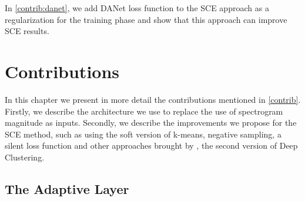 \documentclass[master, tikz, final,11pt, dvipdfmx]{iscs-thesis}
\begin{document}
In \autoref{contrib:danet}, we add DANet loss function to the SCE approach as a regularization for the training phase and show that this approach can improve SCE results.

\chapter{Contributions}

In this chapter we present in more detail the contributions mentioned in \ref{contrib}. Firstly, we describe the architecture we use to replace the use of spectrogram magnitude as inputs. Secondly, we describe the improvements we propose for the SCE method, such as using the soft version of k-means, negative sampling, a silent loss function and other approaches brought by \cite{DPCLV2}, the second version of Deep Clustering.

\section{The Adaptive Layer}
\label{adapt}
\end{document}
